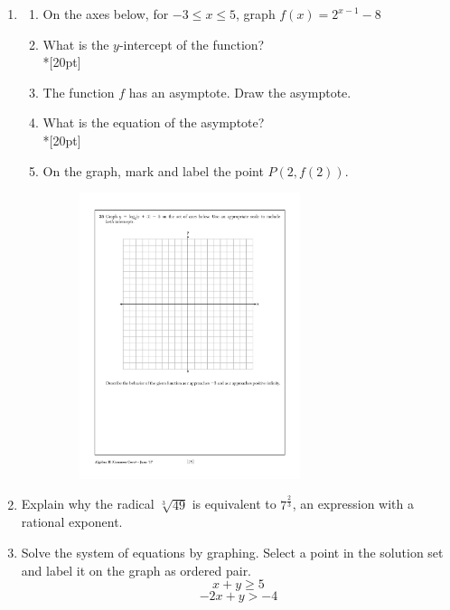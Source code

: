 \documentclass[12pt, oneside]{article}
\begin{document}
\begin{enumerate}
\newpage
\item  
\begin{enumerate}
    \item On the axes below, for $-3 \leq x \leq 5$, graph $f(x)=2^{x-1}-8$

    \item What is the $y$-intercept of the function?\\*[20pt]
    \item The function $f$ has an asymptote. Draw the asymptote.
    \item What is the equation of the asymptote?\\*[20pt]

    \item On the graph, mark and label the point $P (2, f(2))$.

\begin{figure}[!ht]
    \centering
    \includegraphics[width=0.65\textwidth]{regents-grid.pdf}
\end{figure}
\end{enumerate}

\item Explain why the radical $\sqrt[3]{49}$ is equivalent to $7^{\frac{2}{3}}$, an expression with a rational exponent.

\newpage
\item Solve the system of equations by graphing. Select a point in the solution set and label it on the graph as ordered pair.
\[x+y \geq 5\]
\[-2x+y > -4\]


\end{enumerate}
\end{document}
